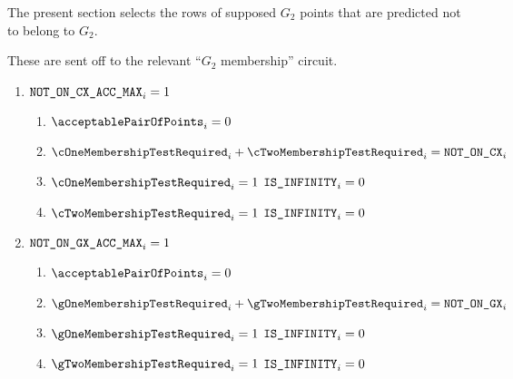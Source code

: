The present section selects the rows of supposed $G_2$ points that are predicted not to belong to $G_2$.


These are sent off to the relevant ``$G_2$ membership'' circuit.
\begin{enumerate}
    \item \If $\texttt{NOT\_ON\_CX\_ACC\_MAX}_{i} = 1$ \Then
          \begin{enumerate}
              \item $\acceptablePairOfPoints_{i} = 0$
              \item $\cOneMembershipTestRequired _{i} + \cTwoMembershipTestRequired _{i} = \notOnCX_{i}$ %
              \item \If $\cOneMembershipTestRequired _{i} = 1$ \Then $\texttt{IS\_INFINITY}_{i} = 0$
              \item \If $\cTwoMembershipTestRequired _{i} = 1$ \Then $\texttt{IS\_INFINITY}_{i} = 0$
          \end{enumerate}
    \item \If $\texttt{NOT\_ON\_GX\_ACC\_MAX}_{i} = 1$ \Then
          \begin{enumerate}
              \item $\acceptablePairOfPoints_{i} = 0$
              \item $\gOneMembershipTestRequired _{i} + \gTwoMembershipTestRequired _{i} = \notOnGX_{i}$ %
              \item \If $\gOneMembershipTestRequired _{i} = 1$ \Then $\texttt{IS\_INFINITY}_{i} = 0$
              \item \If $\gTwoMembershipTestRequired _{i} = 1$ \Then $\texttt{IS\_INFINITY}_{i} = 0$
          \end{enumerate}
\end{enumerate}


